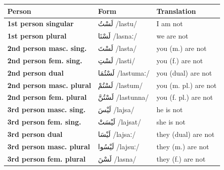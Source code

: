 \documentclass[letterpaper,12pt]{article}
\begin{document}
\begin{longtable}{|>{\raggedright}p{4cm}|p{4cm}|p{5cm}|}
\hline
\textbf{Person} & \textbf{Form} & \textbf{Translation} \\
\hline
\textbf{1st person singular} & \textarabic{لَسْتُ} /lastu/ & I am not \\
\hline
\textbf{1st person plural} & \textarabic{لَسْنَا} /lasnaː/ & we are not \\
\hline
\textbf{2nd person masc. sing.} & \textarabic{لَسْتَ} /lasta/ & you (m.) are not \\
\hline
\textbf{2nd person fem. sing.} & \textarabic{لَسْتِ} /lasti/ & you (f.) are not \\
\hline
\textbf{2nd person dual} & \textarabic{لَسْتُمَا} /lastumaː/ & you (dual) are not \\
\hline
\textbf{2nd person masc. plural} & \textarabic{لَسْتُمْ} /lastum/ & you (m. pl.) are not \\
\hline
\textbf{2nd person fem. plural} & \textarabic{لَسْتُنَّ} /lastunna/ & you (f. pl.) are not \\
\hline
\textbf{3rd person masc. sing.} & \textarabic{لَيْسَ} /lajsa/ & he is not \\
\hline
\textbf{3rd person fem. sing.} & \textarabic{لَيْسَتْ} /lajsat/ & she is not \\
\hline
\textbf{3rd person dual} & \textarabic{لَيْسَا} /lajsaː/ & they (dual) are not \\
\hline
\textbf{3rd person masc. plural} & \textarabic{لَيْسُوا} /lajsuː/ & they (m.) are not \\
\hline
\textbf{3rd person fem. plural} & \textarabic{لَسْنَ} /lasna/ & they (f.) are not \\
\hline
\end{longtable}
\end{document}
